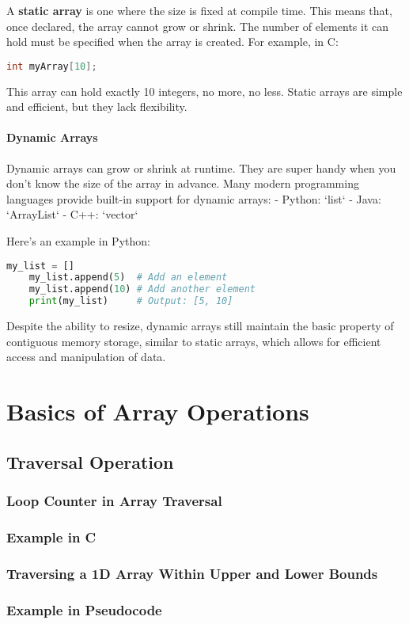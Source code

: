 \documentclass[12pt, oneside]{book}
\begin{document}
A \textbf{static array} is one where the size is fixed at compile time. This means that, once declared, the array cannot grow or shrink. The number of elements it can hold must be specified when the array is created.
For example, in C:
\begin{lstlisting}[language=C]
	int myArray[10];
\end{lstlisting}
This array can hold exactly 10 integers, no more, no less. Static arrays are simple and efficient, but they lack flexibility.

\subsubsection{Dynamic Arrays}
Dynamic arrays can grow or shrink at runtime. They are super handy when you don’t know the size of the array in advance. Many modern programming languages provide built-in support for dynamic arrays:  
- Python: `list`  
- Java: `ArrayList`  
- C++: `vector`  

Here’s an example in Python:
\begin{lstlisting}[language=Python]
	my_list = []
	my_list.append(5)  # Add an element
	my_list.append(10) # Add another element
	print(my_list)     # Output: [5, 10]
\end{lstlisting}
Despite the ability to resize, dynamic arrays still maintain the basic property of contiguous memory storage, similar to static arrays, which allows for efficient access and manipulation of data.

\chapter{Basics of Array Operations}
\section{Traversal Operation}
\subsection{Loop Counter in Array Traversal} 
\subsection{Example in C}
\subsection{Traversing a 1D Array Within Upper and Lower Bounds}
\subsection{ Example in Pseudocode}
\end{document}
